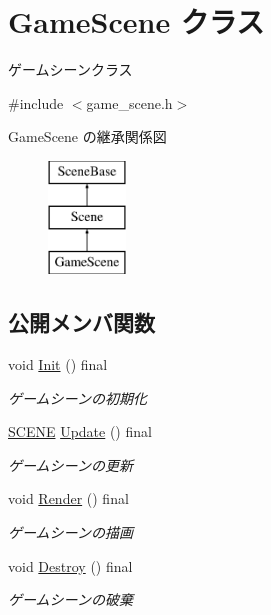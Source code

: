 \hypertarget{class_game_scene}{}\section{Game\+Scene クラス}
\label{class_game_scene}


ゲームシーンクラス  




{\ttfamily \#include $<$game\+\_\+scene.\+h$>$}

Game\+Scene の継承関係図\begin{figure}[H]
\begin{center}
\leavevmode
\includegraphics[height=3.000000cm]{class_game_scene}
\end{center}
\end{figure}
\subsection*{公開メンバ関数}
\begin{DoxyCompactItemize}
\item 
void \mbox{\hyperlink{class_game_scene_a86227765def624b9b227db2aa41d9141}{Init}} () final
\begin{DoxyCompactList}\small\item\em ゲームシーンの初期化 \end{DoxyCompactList}\item 
\mbox{\hyperlink{scene__base_8h_a24cee5343fb9d0706ead6e8601f363be}{S\+C\+E\+NE}} \mbox{\hyperlink{class_game_scene_a2d4c44e96484af17ed3f6fb0402ebafd}{Update}} () final
\begin{DoxyCompactList}\small\item\em ゲームシーンの更新 \end{DoxyCompactList}\item 
void \mbox{\hyperlink{class_game_scene_ae5ecfa81aecd5e959b038142640a1c7b}{Render}} () final
\begin{DoxyCompactList}\small\item\em ゲームシーンの描画 \end{DoxyCompactList}\item 
void \mbox{\hyperlink{class_game_scene_a5c544d5a87a60f09ada75f1f60f0a787}{Destroy}} () final
\begin{DoxyCompactList}\small\item\em ゲームシーンの破棄 \end{DoxyCompactList}\end{DoxyCompactItemize}
